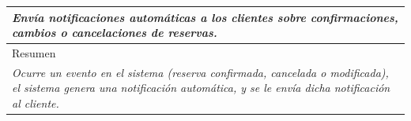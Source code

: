 \begin{table}[H]
\begin{tabular}{|llllllll|}
    \multicolumn{8}{|p{15cm}|}{{\color[HTML]{808080} \textit{Env\'ia notificaciones autom\'aticas a los clientes sobre confirmaciones, cambios o cancelaciones de reservas.}}}                                                                                                                                                                                       \\ \hline
    \multicolumn{8}{|l|}{Resumen}                                                                                                                                                                                                                                           \\ \hline
    \multicolumn{8}{|p{15cm}|}{{\color[HTML]{808080} \textit{Ocurre un evento en el sistema (reserva confirmada, cancelada o modificada), el sistema genera una notificaci\'on autom\'atica, y se le env\'ia dicha notificaci\'on al cliente.}}} \\ \hline
    \end{tabular}
\end{table}